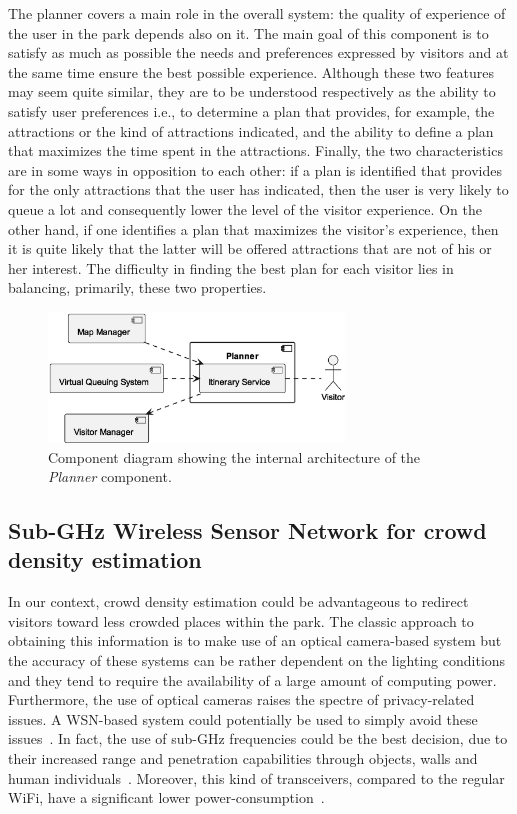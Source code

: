 The planner covers a main role in the overall system: the quality of experience of the user in the park depends also on it.
The main goal of this component is to satisfy as much as possible the needs and preferences expressed by visitors and at the same time ensure the
best possible experience.
Although these two features may seem quite similar, they are to be understood respectively as the ability to satisfy user preferences i.e., to
determine a plan that provides, for example, the attractions or the kind of attractions indicated, and the ability to define a plan that maximizes
the time spent in the attractions.
Finally, the two characteristics are in some ways in opposition to each other: if a plan is identified that provides for the only attractions that
the user has indicated, then the user is very likely to queue a lot and consequently lower the level of the visitor experience. On the other hand, if
one identifies a plan that maximizes the visitor's experience, then it is quite likely that the latter will be offered attractions that are not of
his or her interest.
The difficulty in finding the best plan for each visitor lies in balancing, primarily, these two properties. 

\begin{figure}[H]
	\centering
	\includegraphics[width=0.7\textwidth]{img/planner.eps}
	\caption{Component diagram showing the internal architecture of the \textit{Planner} component.
	}
	\label{fig:planner-arch}
\end{figure}

\subsection{Sub-GHz Wireless Sensor Network for crowd density estimation}\label{subsec:sub-ghz-wireless-sensor-network-for-crowd-density-estimation}
In our context, crowd density estimation could be advantageous to redirect visitors toward less crowded places within the park.
The classic approach to obtaining this information is to make use of an optical camera-based system but the accuracy of these systems can be
rather dependent on the lighting conditions and they tend to require the availability of a large amount of computing power.
Furthermore, the use of optical cameras raises the spectre of privacy-related issues.
A WSN-based system could potentially be used to simply avoid these issues~\cite{denis2018large}.
In fact, the use of sub-GHz frequencies could be the best decision, due to their increased range and penetration capabilities through objects, walls and human individuals~\cite{denis2018large}.
Moreover, this kind of transceivers, compared to the regular WiFi, have a significant lower power-consumption~\cite{fudickar2014comparing}.


